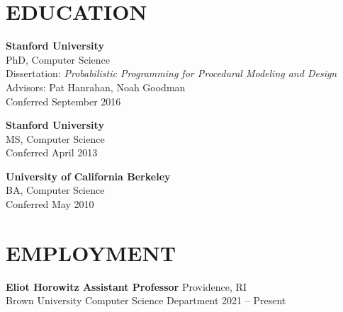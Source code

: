 \documentclass[line,margin]{res}
\begin{document}
\address{ \url{dritchie.github.io} $\cdot$ \url{daniel_ritchie@brown.edu} }
 
\begin{resume}


 
\section{EDUCATION}
\textbf{Stanford University} \\
PhD, Computer Science \\
Dissertation: \emph{Probabilistic Programming for Procedural Modeling and Design} \\
Advisors: Pat Hanrahan, Noah Goodman \\
Conferred September 2016

\textbf{Stanford University} \\
MS, Computer Science \\
Conferred April 2013

\textbf{University of California Berkeley} \\
BA, Computer Science \\
Conferred May 2010


\section{EMPLOYMENT}

\newcommand{\job}[4] {
	\textbf{#1} \hfill #3\\
	#2 \hfill #4
}

\job
{Eliot Horowitz Assistant Professor}
{Brown University Computer Science Department}
{Providence, RI}
{2021 -- Present}


\end{resume}
\end{document}
